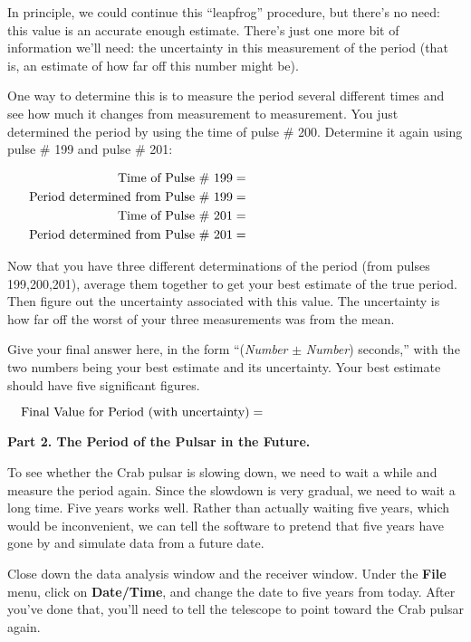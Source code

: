 In principle, we could continue this ``leapfrog'' procedure, but
there's no need: this value is an accurate enough estimate.  There's
just one more bit of information we'll need: the uncertainty in this
measurement of the period (that is, an estimate of how far off
this number might be).  

One way to determine this is to measure the period several different times
and see how much it changes from measurement to measurement.  You
just determined the period by using the time of pulse \# 200.  
Determine it again using pulse \# 199 and pulse \# 201:

\medskip
\begin{eqnarray*}
\mbox{Time of Pulse \# 199}&=&\hbox to 2in{}\\
\mbox{Period determined from Pulse \# 199}&=&\hbox to 2in{}\\
\mbox{Time of Pulse \# 201}&=&\hbox to 2in{}\\
\mbox{Period determined from Pulse \# 201}&=&\hbox to 2in{}\\
\end{eqnarray*}
\medskip

Now that you have three different determinations of the period (from pulses
199,200,201), average them together to get your best estimate of the
true period.  Then figure out the uncertainty associated with this
value.  The uncertainty is how far off the worst of your three
measurements was from the mean.

Give your final answer here, in the form ``({\it Number}
 $\pm$ {\it Number}) seconds,''  with the two numbers being your
best estimate and its uncertainty.  Your best estimate should have five
significant figures.

\medskip
$$
\mbox{Final Value for Period (with uncertainty)}=\hbox to 2in{}
$$

\bigskip\bigskip

{\bf Part 2. The Period of the Pulsar in the Future.}

To see whether the Crab pulsar is slowing down, we need to wait
a while and measure the period again.  Since the slowdown is very
gradual, we need to wait a long time.  Five years works well.
Rather than actually waiting five years, which would be inconvenient,
we can tell the software to pretend that five years have gone by
and simulate data from a future date.

Close down the data analysis window and the receiver window.  Under
the {\bf File} menu, click on {\bf Date/Time}, and change the date to
five years from today.  After you've done that, you'll need to tell
the telescope to point toward the Crab pulsar again.

